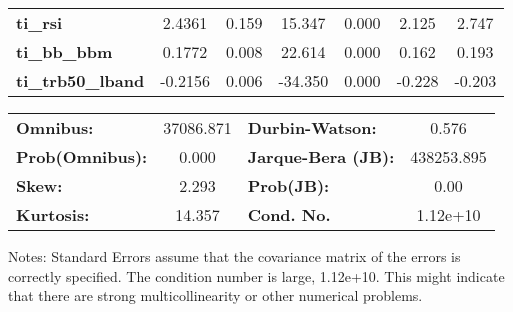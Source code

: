 \begin{center}
\begin{tabular}{lcccccc}
\textbf{ti\_rsi}            &       2.4361  &        0.159     &    15.347  &         0.000        &        2.125    &        2.747     \\
\textbf{ti\_bb\_bbm}        &       0.1772  &        0.008     &    22.614  &         0.000        &        0.162    &        0.193     \\
\textbf{ti\_trb50\_lband}   &      -0.2156  &        0.006     &   -34.350  &         0.000        &       -0.228    &       -0.203     \\
\bottomrule
\end{tabular}
\begin{tabular}{lclc}
\textbf{Omnibus:}       & 37086.871 & \textbf{  Durbin-Watson:     } &     0.576   \\
\textbf{Prob(Omnibus):} &    0.000  & \textbf{  Jarque-Bera (JB):  } & 438253.895  \\
\textbf{Skew:}          &    2.293  & \textbf{  Prob(JB):          } &      0.00   \\
\textbf{Kurtosis:}      &   14.357  & \textbf{  Cond. No.          } &  1.12e+10   \\
\bottomrule
\end{tabular}
\end{center}

Notes: \newline
 [1] Standard Errors assume that the covariance matrix of the errors is correctly specified. \newline
 [2] The condition number is large, 1.12e+10. This might indicate that there are \newline
 strong multicollinearity or other numerical problems.

